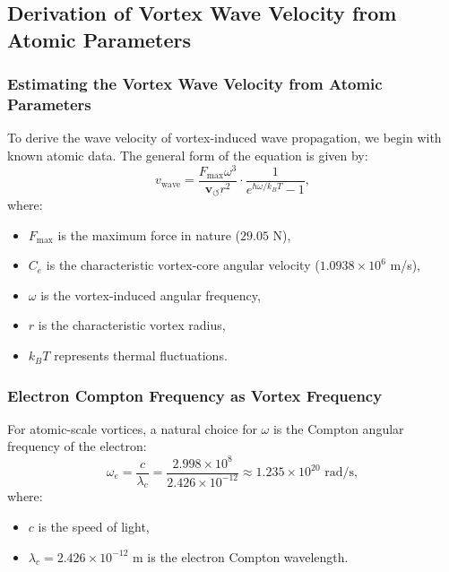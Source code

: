     \subsection{Derivation of Vortex Wave Velocity from Atomic Parameters}

    \subsubsection*{Estimating the Vortex Wave Velocity from Atomic Parameters}
    To derive the wave velocity of vortex-induced wave propagation, we begin with known atomic data. The general form of the equation is given by:
    \begin{equation*}
        v_\text{wave} = \frac{F_{\max} \omega^3}{\mathbf{v}_{\scriptscriptstyle\boldsymbol{\circlearrowleft}} r^2} \cdot \frac{1}{e^{\hbar \omega / k_B T} - 1},
    \end{equation*}
    where:
    \begin{itemize}
        \item $F_{\max}$ is the maximum force in nature ($29.05$ N),
        \item $C_e$ is the characteristic vortex-core angular velocity ($1.0938 \times 10^6$ m/s),
        \item $\omega$ is the vortex-induced angular frequency,
        \item $r$ is the characteristic vortex radius,
        \item $k_B T$ represents thermal fluctuations.
    \end{itemize}

    \subsubsection*{Electron Compton Frequency as Vortex Frequency}
    For atomic-scale vortices, a natural choice for $\omega$ is the Compton angular frequency of the electron:
    \begin{equation*}
        \omega_e = \frac{c}{\lambda_c} = \frac{2.998 \times 10^8}{2.426 \times 10^{-12}} \approx 1.235 \times 10^{20} \text{ rad/s},
    \end{equation*}
    where:
    \begin{itemize}
        \item $c$ is the speed of light,
        \item $\lambda_c = 2.426 \times 10^{-12}$ m is the electron Compton wavelength.
    \end{itemize}

